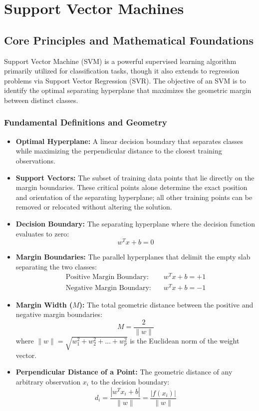 \chapter{Support Vector Machines}

\section{Core Principles and Mathematical Foundations}

Support Vector Machine (SVM) is a powerful supervised learning algorithm primarily utilized for classification tasks, though it also extends to regression problems via Support Vector Regression (SVR). The objective of an SVM is to identify the optimal separating hyperplane that maximizes the geometric margin between distinct classes.

\subsection{Fundamental Definitions and Geometry}
\begin{itemize}
    \item \textbf{Optimal Hyperplane:} A linear decision boundary that separates classes while maximizing the perpendicular distance to the closest training observations.
    \item \textbf{Support Vectors:} The subset of training data points that lie directly on the margin boundaries. These critical points alone determine the exact position and orientation of the separating hyperplane; all other training points can be removed or relocated without altering the solution.
    \item \textbf{Decision Boundary:} The separating hyperplane where the decision function evaluates to zero:
    \begin{equation}
    w^T x + b = 0
    \end{equation}
    \item \textbf{Margin Boundaries:} The parallel hyperplanes that delimit the empty slab separating the two classes:
    \begin{align}
    \text{Positive Margin Boundary:} \quad & w^T x + b = +1 \\
    \text{Negative Margin Boundary:} \quad & w^T x + b = -1
    \end{align}
    \item \textbf{Margin Width ($M$):} The total geometric distance between the positive and negative margin boundaries:
    \begin{equation}
    M = \frac{2}{\|w\|}
    \end{equation}
    where $\|w\| = \sqrt{w_1^2 + w_2^2 + \dots + w_p^2}$ is the Euclidean norm of the weight vector.
    \item \textbf{Perpendicular Distance of a Point:} The geometric distance of any arbitrary observation $x_i$ to the decision boundary:
    \begin{equation}
    d_i = \frac{|w^T x_i + b|}{\|w\|} = \frac{|f(x_i)|}{\|w\|}
    \end{equation}
\end{itemize}

